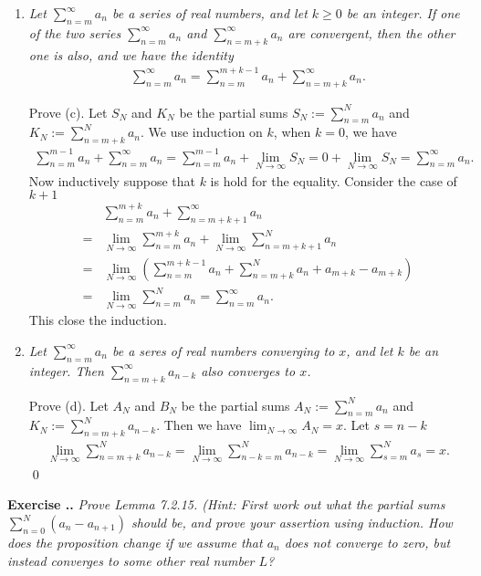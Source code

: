 \documentclass{book}
\newcounter{Exercise}[section]
\renewcommand{\theExercise}{\thesection.\arabic{Exercise}.}
\newcommand{\new}{\vspace{1.5em}\noindent\textbf{{Exercise \stepcounter{Exercise}\textbf{\theExercise}}} }
\begin{document}
\begin{enumerate}
    \item \emph{Let $\sum_{n=m}^{\infty}a_n$ be a series of real numbers, and let $k\geq 0$ be an integer. If one of the two series $\sum_{n=m}^{\infty}a_n$ and $\sum_{n=m+k}^{\infty}a_n$ are convergent, then the other one is also, and we have the identity}
    \begin{align*}
        \sum_{n=m}^{\infty}a_n=\sum_{n=m}^{m+k-1}a_n+\sum_{n=m+k}^{\infty}a_n.
    \end{align*}

    Prove (c). Let $S_N$ and $K_N$ be the partial sums $S_N:=\sum_{n=m}^{N}a_n$ and $K_N:=\sum_{n=m+k}^{N}a_n$. 
    We use induction on $k$, when $k=0$, we have
    \begin{align*}
        \sum_{n=m}^{m-1}a_n+\sum_{n=m}^{\infty}a_n
        =\sum_{n=m}^{m-1}a_n+\lim_{N\to\infty}S_N
        =0+\lim_{N\to\infty}S_N
        =\sum_{n=m}^{\infty}a_n.
    \end{align*}
    Now inductively suppose that $k$ is hold for the equality. Consider the case of $k+1$
    \begin{align*}
        &\sum_{n=m}^{m+k}a_n+\sum_{n=m+k+1}^{\infty}a_n\\
        =&\lim_{N\to\infty}\sum_{n=m}^{m+k}a_n+\lim_{N\to\infty}\sum_{n=m+k+1}^{N}a_n\\
        =&\lim_{N\to\infty}\left(\sum_{n=m}^{m+k-1}a_n+\sum_{n=m+k}^{N}a_n+a_{m+k}-a_{m+k}\right)\\
        =&\lim_{N\to\infty}\sum_{n=m}^{N}a_n=\sum_{n=m}^{\infty}a_n.
    \end{align*}
    This close the induction.

    \item \emph{Let $\sum_{n=m}^{\infty}a_n$ be a seres of real numbers converging to $x$, and let $k$ be an integer. Then $\sum_{n=m+k}^{\infty}a_{n-k}$ also converges to $x$.}
    
    Prove (d). Let $A_N$ and $B_N$ be the partial sums $A_N:=\sum_{n=m}^{N}a_n$ and $K_N:=\sum_{n=m+k}^{N}a_{n-k}$. Then we have $\lim_{N\to\infty}A_N=x$. Let $s=n-k$
    \begin{align*}
        \lim_{N\to\infty}\sum_{n=m+k}^{N}a_{n-k}=\lim_{N\to\infty}\sum_{n-k=m}^{N}a_{n-k}=\lim_{N\to\infty}\sum_{s=m}^{N}a_{s}=x.
    \end{align*}\qed
\end{enumerate}


\new\emph{Prove Lemma 7.2.15. (Hint: First work out what the partial sums $\sum_{n=0}^N(a_n-a_{n+1})$ should be, and prove your assertion using induction. How does the proposition change if we assume that $a_n$ does not converge to zero, but instead converges to some other real number $L$?}
\end{document}
